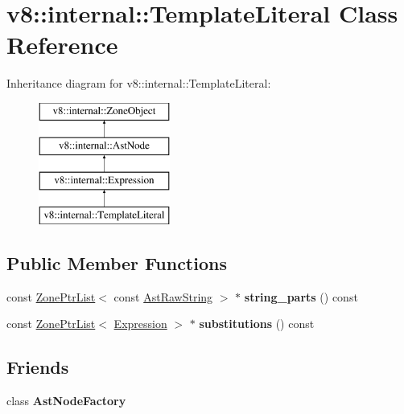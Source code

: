 \hypertarget{classv8_1_1internal_1_1TemplateLiteral}{}\section{v8\+:\+:internal\+:\+:Template\+Literal Class Reference}
\label{classv8_1_1internal_1_1TemplateLiteral}
Inheritance diagram for v8\+:\+:internal\+:\+:Template\+Literal\+:\begin{figure}[H]
\begin{center}
\leavevmode
\includegraphics[height=4.000000cm]{classv8_1_1internal_1_1TemplateLiteral}
\end{center}
\end{figure}
\subsection*{Public Member Functions}
\begin{DoxyCompactItemize}
\item 
\mbox{\label{classv8_1_1internal_1_1TemplateLiteral_ac37bde19c7b1ba7655a21693cd5c70f2}} 
const \mbox{\hyperlink{classv8_1_1internal_1_1ZoneList}{Zone\+Ptr\+List}}$<$ const \mbox{\hyperlink{classv8_1_1internal_1_1AstRawString}{Ast\+Raw\+String}} $>$ $\ast$ {\bfseries string\+\_\+parts} () const
\item 
\mbox{\label{classv8_1_1internal_1_1TemplateLiteral_a9ee833f935cf7c58db7394d09761ee36}} 
const \mbox{\hyperlink{classv8_1_1internal_1_1ZoneList}{Zone\+Ptr\+List}}$<$ \mbox{\hyperlink{classv8_1_1internal_1_1Expression}{Expression}} $>$ $\ast$ {\bfseries substitutions} () const
\end{DoxyCompactItemize}
\subsection*{Friends}
\begin{DoxyCompactItemize}
\item 
\mbox{\label{classv8_1_1internal_1_1TemplateLiteral_a8d587c8ad3515ff6433eb83c578e795f}} 
class {\bfseries Ast\+Node\+Factory}
\end{DoxyCompactItemize}
